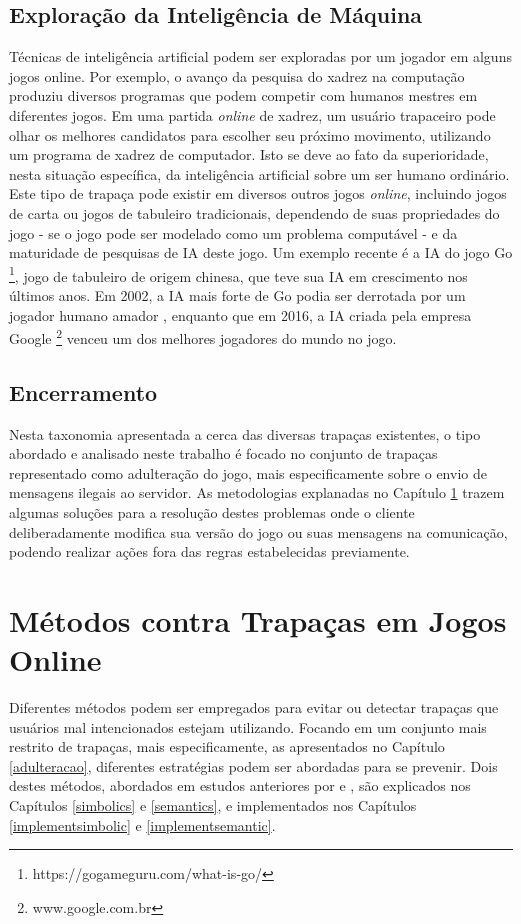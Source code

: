 \subsection{Exploração da Inteligência de Máquina}
Técnicas de inteligência artificial podem ser exploradas por um jogador em alguns jogos online. Por exemplo, o avanço da pesquisa do xadrez na computação produziu diversos programas que podem competir com humanos mestres em diferentes jogos. Em uma partida \textit{online} de xadrez, um usuário trapaceiro pode olhar os melhores candidatos para escolher seu próximo movimento, utilizando um programa de xadrez de computador. Isto se deve ao fato da superioridade, nesta situação específica, da inteligência artificial sobre um ser humano ordinário. Este tipo de trapaça pode existir em diversos outros jogos \textit{online}, incluindo jogos de carta ou jogos de tabuleiro tradicionais, dependendo de suas propriedades do jogo - se o jogo pode ser modelado como um problema computável - e da maturidade de pesquisas de IA deste jogo. Um exemplo recente é a IA do jogo Go \footnote{https://gogameguru.com/what-is-go/}, jogo de tabuleiro de origem chinesa,  que teve sua IA em crescimento nos últimos anos. Em 2002, a IA mais forte de Go podia ser derrotada por um jogador humano amador \cite{go_old}, enquanto que em 2016, a IA criada pela empresa Google \footnote{www.google.com.br} venceu um dos melhores jogadores do mundo no jogo. \cite{ia_google} 

\subsection{Encerramento}

Nesta taxonomia apresentada a cerca das diversas trapaças existentes, o tipo abordado e analisado neste trabalho é focado no conjunto de trapaças representado como adulteração do jogo, mais especificamente sobre o envio de mensagens ilegais ao servidor. As metodologias explanadas no Capítulo \ref{cap:metodologias} trazem algumas soluções para a resolução destes problemas onde o cliente deliberadamente modifica sua versão do jogo ou suas mensagens na comunicação, podendo realizar ações fora das regras estabelecidas previamente.


\section{Métodos contra Trapaças em Jogos Online}
\label{cap:metodologias}

Diferentes métodos podem ser empregados para evitar ou detectar trapaças que usuários mal intencionados estejam utilizando. Focando em um conjunto mais restrito de trapaças, mais especificamente, as apresentados no Capítulo \ref{adulteracao}, diferentes estratégias podem ser abordadas para se prevenir. Dois destes métodos, abordados em estudos anteriores por \cite{NVE} e \cite{implementacaosimbolica}, são explicados nos Capítulos \ref{simbolics} e \ref{semantics}, e implementados nos Capítulos \ref{implementsimbolic} e \ref{implementsemantic}.

